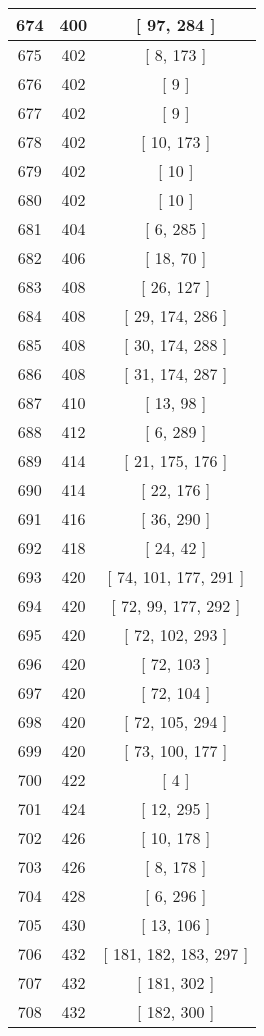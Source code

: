 \begin{center}
\begin{longtable}[H]{|| c c c ||}
\hline
674 & 400 & [ 97, 284 ] \\ 
\hline
675 & 402 & [ 8, 173 ] \\ 
\hline
676 & 402 & [ 9 ] \\ 
\hline
677 & 402 & [ 9 ] \\ 
\hline
678 & 402 & [ 10, 173 ] \\ 
\hline
679 & 402 & [ 10 ] \\ 
\hline
680 & 402 & [ 10 ] \\ 
\hline
681 & 404 & [ 6, 285 ] \\ 
\hline
682 & 406 & [ 18, 70 ] \\ 
\hline
683 & 408 & [ 26, 127 ] \\ 
\hline
684 & 408 & [ 29, 174, 286 ] \\ 
\hline
685 & 408 & [ 30, 174, 288 ] \\ 
\hline
686 & 408 & [ 31, 174, 287 ] \\ 
\hline
687 & 410 & [ 13, 98 ] \\ 
\hline
688 & 412 & [ 6, 289 ] \\ 
\hline
689 & 414 & [ 21, 175, 176 ] \\ 
\hline
690 & 414 & [ 22, 176 ] \\ 
\hline
691 & 416 & [ 36, 290 ] \\ 
\hline
692 & 418 & [ 24, 42 ] \\ 
\hline
693 & 420 & [ 74, 101, 177, 291 ] \\ 
\hline
694 & 420 & [ 72, 99, 177, 292 ] \\ 
\hline
695 & 420 & [ 72, 102, 293 ] \\ 
\hline
696 & 420 & [ 72, 103 ] \\ 
\hline
697 & 420 & [ 72, 104 ] \\ 
\hline
698 & 420 & [ 72, 105, 294 ] \\ 
\hline
699 & 420 & [ 73, 100, 177 ] \\ 
\hline
700 & 422 & [ 4 ] \\ 
\hline
701 & 424 & [ 12, 295 ] \\ 
\hline
702 & 426 & [ 10, 178 ] \\ 
\hline
703 & 426 & [ 8, 178 ] \\ 
\hline
704 & 428 & [ 6, 296 ] \\ 
\hline
705 & 430 & [ 13, 106 ] \\ 
\hline
706 & 432 & [ 181, 182, 183, 297 ] \\ 
\hline
707 & 432 & [ 181, 302 ] \\ 
\hline
708 & 432 & [ 182, 300 ] \\ 

\end{longtable}
\end{center}
